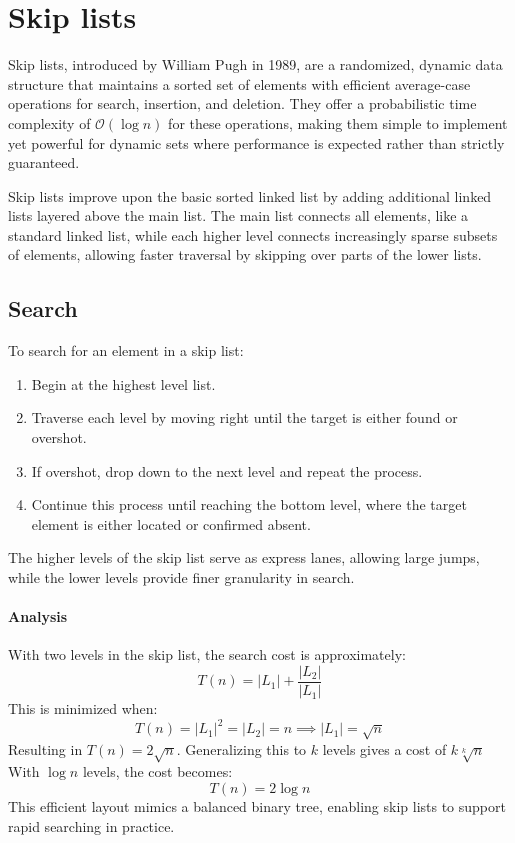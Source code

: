 \section{Skip lists}

Skip lists, introduced by William Pugh in 1989, are a randomized, dynamic data structure that maintains a sorted set of elements with efficient average-case operations for search, insertion, and deletion.
They offer a probabilistic time complexity of $\mathcal{O}(\log n)$ for these operations, making them simple to implement yet powerful for dynamic sets where performance is expected rather than strictly guaranteed.

Skip lists improve upon the basic sorted linked list by adding additional linked lists layered above the main list. 
The main list connects all elements, like a standard linked list, while each higher level connects increasingly sparse subsets of elements, allowing faster traversal by skipping over parts of the lower lists.

\subsection{Search}
To search for an element in a skip list:
\begin{enumerate} 
    \item Begin at the highest level list.
    \item Traverse each level by moving right until the target is either found or overshot.
    \item If overshot, drop down to the next level and repeat the process.
    \item Continue this process until reaching the bottom level, where the target element is either located or confirmed absent.
\end{enumerate} 
The higher levels of the skip list serve as express lanes, allowing large jumps, while the lower levels provide finer granularity in search.

\paragraph*{Analysis}
With two levels in the skip list, the search cost is approximately:
\[T(n)=\left\lvert L_1\right\rvert +\dfrac{\left\lvert L_2\right\rvert }{\left\lvert L_1\right\rvert }\]
This is minimized when:
\[T(n)=\left\lvert L_1\right\rvert ^2=\left\lvert L_2\right\rvert =n\implies \left\lvert L_1\right\rvert =\sqrt{n}\]
Resulting in $T(n)=2\sqrt{n}$. 
Generalizing this to $k$ levels gives a cost of $k\sqrt[k]{n}$
With $\log n$ levels, the cost becomes:
\[T(n)=2\log n\]
This efficient layout mimics a balanced binary tree, enabling skip lists to support rapid searching in practice.

